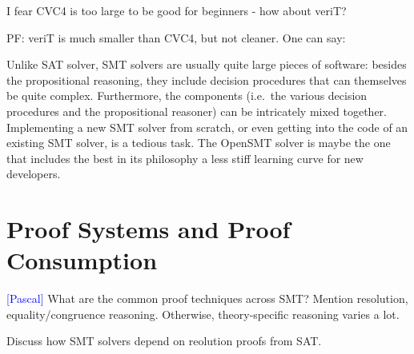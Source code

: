 \documentclass{llncs}
\newcommand{\Note}[1]{\textcolor{blue}{[#1]}}
\begin{document}
I fear CVC4 is too large to be good for beginners - how about veriT?

PF: veriT is much smaller than CVC4, but not cleaner.  One can say:

Unlike SAT solver, SMT solvers are usually quite large pieces of software:
besides the propositional reasoning, they include decision procedures that can
themselves be quite complex.  Furthermore, the components (i.e.\ the various
decision procedures and the propositional reasoner) can be intricately mixed
together.  Implementing a new SMT solver from scratch, or even getting into the
code of an existing SMT solver, is a tedious task.  The OpenSMT solver is maybe
the one that includes the best in its philosophy a less stiff learning curve for
new developers.

\section{Proof Systems and Proof Consumption}

\Note{Pascal}
What are the common proof techniques across SMT?  Mention resolution,
equality/congruence reasoning.  Otherwise, theory-specific reasoning varies a lot.





Discuss how SMT solvers depend on reolution proofs from SAT.

\end{document}
